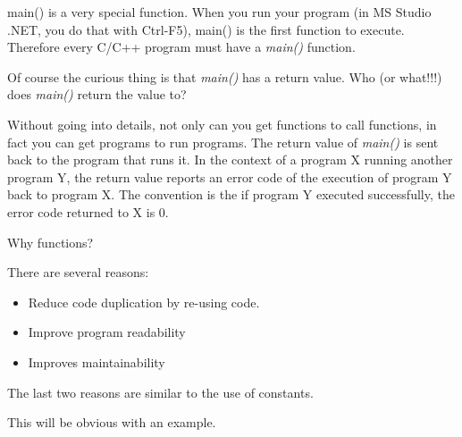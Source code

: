 \documentclass[
]{article}
\providecommand{\tightlist}{%
  \setlength{\itemsep}{0pt}\setlength{\parskip}{0pt}}
\begin{document}
main() is a very special function. When you run your program (in MS
Studio .NET, you do that with Ctrl-F5), main() is the first function to
execute. Therefore every C/C++ program must have a \emph{main()}
function.

Of course the curious thing is that \emph{main()} has a return value.
Who (or what!!!) does \emph{main()} return the value to?

Without going into details, not only can you get functions to call
functions, in fact you can get programs to run programs. The return
value of \emph{main()} is sent back to the program that runs it. In the
context of a program X running another program Y, the return value
reports an error code of the execution of program Y back to program X.
The convention is the if program Y executed successfully, the error code
returned to X is 0.

Why functions?

There are several reasons:

\begin{itemize}
\tightlist
\item
  Reduce code duplication by re-using code.
\item
  Improve program readability
\item
  Improves maintainability
\end{itemize}

The last two reasons are similar to the use of constants.

This will be obvious with an example.
\end{document}

